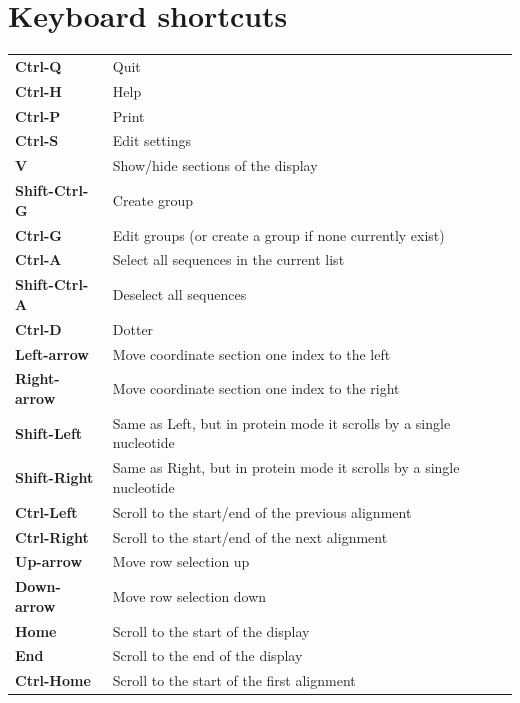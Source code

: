 \documentclass[letterpaper]{article}
\begin{document}
{\color[rgb]{0.0,0.27058825,0.5254902}\section[Keyboard shortcuts]{Keyboard shortcuts}}
\hypertarget{RefHeading2701056909880}{}
\bigskip

\begin{flushleft}
\tablehead{}
\begin{supertabular}{p{2.222cm}p{11.729cm}}
\bfseries Ctrl-Q &
 Quit\\
\bfseries Ctrl-H &
 Help\\
\bfseries Ctrl-P &
 Print\\
\bfseries Ctrl-S &
 Edit settings\\
\bfseries V &
 Show/hide sections of the display\\
\bfseries Shift-Ctrl-G &
 Create group\\
\bfseries Ctrl-G &
 Edit groups (or create a group if none
currently exist)\\
\bfseries Ctrl-A &
 Select all sequences in the current list\\
\bfseries Shift-Ctrl-A &
 Deselect all sequences\\
\bfseries Ctrl-D &
 Dotter\\
\bfseries Left-arrow &
 Move coordinate section one index to the
left\footnotemark[2]\\
\bfseries Right-arrow &
 Move coordinate section one index to the
right\footnotemark[2] \\
\bfseries Shift-Left &
 Same as Left, but in protein mode it scrolls by
a single nucleotide\\
\bfseries Shift-Right &
 Same as Right, but in protein mode it scrolls
by a single nucleotide\\
\bfseries Ctrl-Left &
 Scroll to the start/end of the previous
alignment\footnotemark[3]\\
\bfseries Ctrl-Right &
 Scroll to the start/end of the next
alignment\footnotemark[3] \\
\bfseries Up-arrow &
 Move row selection up \\
\bfseries Down-arrow &
 Move row selection down \ \\
\bfseries Home &
 Scroll to the start of the display\\
\bfseries End &
 Scroll to the end of the display\\
\bfseries Ctrl-Home &
 Scroll to the start of the first
alignment\footnotemark[3] \\

\end{supertabular}
\end{flushleft}
\end{document}
